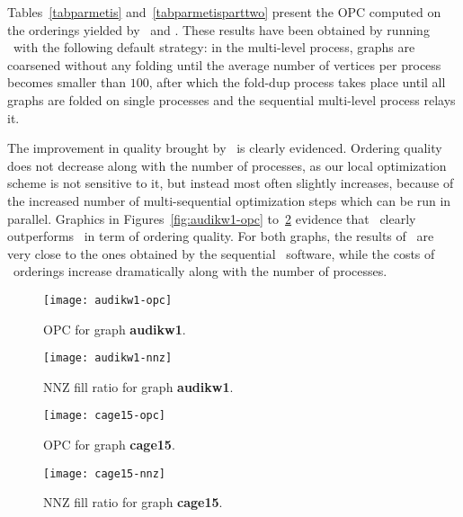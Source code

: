\documentclass[fleqn,12pt,twoside]{article}
\begin{document}
Tables~\ref{tabparmetis} and~\ref{tabparmetisparttwo} present the OPC
computed on the orderings yielded by \ptscotch\ and \parmetis. These
results have been obtained by running \ptscotch\ with the following
default strategy: in the multi-level process, graphs are coarsened
without any folding until the average number of vertices per process
becomes smaller than $100$, after which the fold-dup process takes
place until all graphs are folded on single processes and the
sequential multi-level process relays it.

The improvement in quality brought by \ptscotch\ is clearly evidenced.
Ordering quality does not decrease along with the number of processes,
as our local optimization scheme is not sensitive to it, but instead
most often slightly increases, because of the increased number of
multi-sequential optimization steps which can be run in parallel.
Graphics in Figures~\ref{fig:audikw1-opc} to~\ref{fig:cage15-nnz}
evidence that \ptscotch\ clearly outperforms \parmetis\ in term of
ordering quality. For both graphs, the results of \ptscotch\ are
very close to the ones obtained by the sequential \scotch\ software,
while the costs of \parmetis\ orderings increase dramatically along
with the number of processes.

\begin{figure}[htb]
\begin{minipage}[t]{0.47\textwidth}
\texttt{[image: audikw1-opc]}
\vspace*{-3.5em}
\caption{OPC for graph \textbf{audikw1}.}
\label{fig:audikw1-opc}
\end{minipage}\hspace{\fill}\begin{minipage}[t]{0.47\textwidth}
\texttt{[image: audikw1-nnz]}
\vspace*{-3.5em}
\caption{NNZ fill ratio for graph \textbf{audikw1}.}
\label{fig:audikw1-nnz}
\end{minipage}
\end{figure}

\begin{figure}[htb]
\begin{minipage}[t]{0.47\textwidth}
\texttt{[image: cage15-opc]}
\vspace*{-3.5em}
\caption{OPC for graph \textbf{cage15}.}
\label{fig:cage15-opc}
\end{minipage}\hspace{\fill}\begin{minipage}[t]{0.47\textwidth}
\texttt{[image: cage15-nnz]}
\vspace*{-3.5em}
\caption{NNZ fill ratio for graph \textbf{cage15}.}
\label{fig:cage15-nnz}
\end{minipage}
\end{figure}
\end{document}
